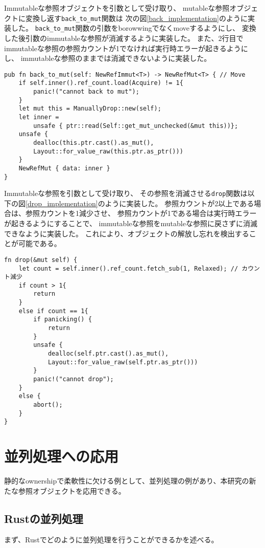 \documentclass{sumiilab-paper}
\theoremstyle{mystyle}
\numberwithin{definition}{chapter} %
\begin{document}
Immutableな参照オブジェクトを引数として受け取り、
mutableな参照オブジェクトに変換し返す\texttt{back\_to\_mut}関数は
次の図\ref{back_implementation}のように実装した。
\texttt{back\_to\_mut}関数の引数をborowwingでなくmoveするようにし、
変換した後引数のimmutableな参照が消滅するように実装した。
また、2行目でimmutableな参照の参照カウントが1でなければ実行時エラーが起きるようにし、
immutableな参照のままでは消滅できないように実装した。
\begin{lstlisting}[caption=関数back\_to\_mutの実装, label=back_implementation, captionpos=b]
pub fn back_to_mut(self: NewRefImmut<T>) -> NewRefMut<T> { // Move
    if self.inner().ref_count.load(Acquire) != 1{
        panic!("cannot back to mut");
    }
    let mut this = ManuallyDrop::new(self);
    let inner =
        unsafe { ptr::read(Self::get_mut_unchecked(&mut this))};
    unsafe {
        dealloc(this.ptr.cast().as_mut(), 
        Layout::for_value_raw(this.ptr.as_ptr()))
    }
    NewRefMut { data: inner }
}
\end{lstlisting}

Immutableな参照を引数として受け取り、
その参照を消滅させる\texttt{drop}関数は以下の図\ref{drop_implementation}のように実装した。
参照カウントが2以上である場合は、参照カウントを1減少させ、
参照カウントが1である場合は実行時エラーが起きるようにすることで、
immutableな参照をmutableな参照に戻さずに消滅できなように実装した。
これにより、オブジェクトの解放し忘れを検出することが可能である。
\begin{lstlisting}[caption=関数back\_to\_mutの実装, label=drop_implementation, captionpos=b]
fn drop(&mut self) {
    let count = self.inner().ref_count.fetch_sub(1, Relaxed); // カウント減少
    if count > 1{
        return
    }
    else if count == 1{
        if panicking() {
            return
        }
        unsafe {
            dealloc(self.ptr.cast().as_mut(), 
            Layout::for_value_raw(self.ptr.as_ptr()))
        }
        panic!("cannot drop");
    }
    else {
        abort();
    }
}
\end{lstlisting}

\chapter{並列処理への応用}
静的なownershipで柔軟性に欠ける例として、並列処理の例があり、本研究の新たな参照オブジェクトを応用できる。

\section{Rustの並列処理}
まず、Rustでどのように並列処理を行うことができるかを述べる。
\end{document}
